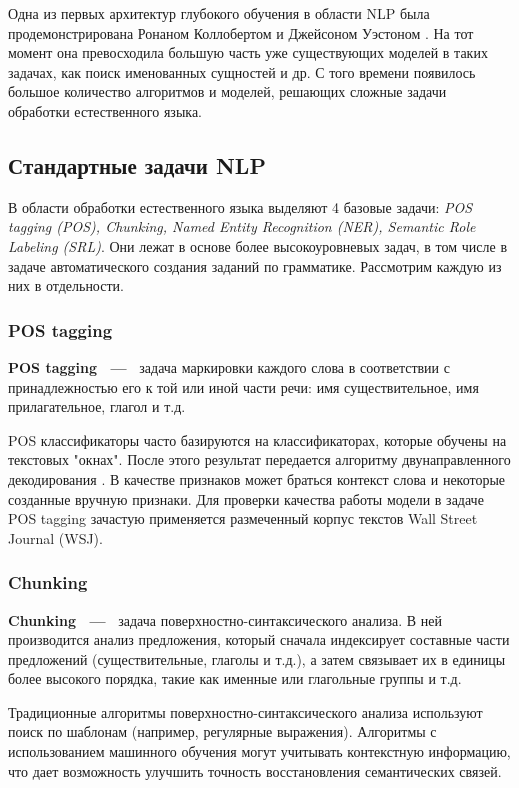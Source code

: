 Одна из первых архитектур глубокого обучения в области NLP была продемонстрирована Ронаном Коллобертом и Джейсоном Уэстоном \autocite{DBLP:journals/corr/abs-1103-0398}. На тот момент она превосходила большую часть уже существующих моделей в таких задачах, как поиск именованных сущностей и др. С того времени появилось большое количество алгоритмов и моделей, решающих сложные задачи обработки естественного языка.

\newpage
\subsection{Стандартные задачи NLP}
\label{subsec:standard}
В области обработки естественного языка выделяют 4 базовые задачи:\emph{ POS tagging (POS), Chunking, Named Entity Recognition (NER), Semantic Role Labeling (SRL)}. Они лежат в основе более высокоуровневых задач, в том числе в задаче автоматического создания заданий по грамматике. Рассмотрим каждую из них в отдельности.
\subsubsection{POS tagging}
\textbf{POS tagging ~---~} задача маркировки каждого слова в соответствии с принадлежностью его к той или иной части речи: имя существительное, имя прилагательное, глагол и т.д.

POS классификаторы часто базируются на классификаторах, которые обучены на текстовых "окнах". После этого результат передается алгоритму двунаправленного декодирования \autocite{watanabe-sumita-2002-bidirectional}. В качестве признаков может браться контекст слова и некоторые созданные вручную признаки.
Для проверки качества работы модели в задаче POS tagging зачастую применяется размеченный корпус текстов Wall Street Journal (WSJ).
\subsubsection{Chunking}
\textbf{Chunking  ~---~} задача поверхностно-синтаксического анализа. В  ней производится анализ предложения, который сначала индексирует составные части предложений (существительные, глаголы и т.д.), а затем связывает их в единицы более высокого порядка, такие как именные или глагольные группы и т.д.

Традиционные алгоритмы поверхностно-синтаксического анализа используют поиск по шаблонам (например, регулярные выражения). Алгоритмы с использованием машинного обучения могут учитывать контекстную информацию, что дает возможность улучшить точность восстановления семантических связей.
